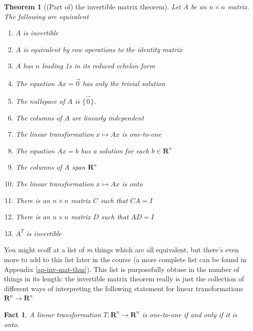 \documentclass[12pt]{article}
\numberwithin{equation}{subsection}
\numberwithin{figure}{subsection}
\newtheorem{thm}[subsection]{Theorem}
\newtheorem{fact}[subsection]{Fact}
\theoremstyle{note}
\begin{document}
\begin{thm}[(Part of) the invertible matrix theorem]\label{thm-inv-matrix-1}
	Let $A$ be an $n\times n$ matrix. The following are equivalent
	\begin{enumerate}
		\item $A$ is invertible
		\item $A$ is equivalent by row operations to the identity matrix
		\item $A$ has $n$ leading 1s in its reduced echelon form
		\item The equation $Ax=\vec{0}$ has only the trivial solution
		\item The nullspace of $A$ is $\{\vec{0}\}$. 
		\item The columns of $A$ are linearly independent
		\item The linear transformation $x\mapsto Ax$ is one-to-one
		\item The equation $Ax=b$ has a solution for each $b\in\mathbf{R}^n$
		\item The columns of $A$ span $\mathbf{R}^n$
		\item The linear transformation $x\mapsto Ax$ is onto
		\item There is an $n\times n$ matrix $C$ such that $CA=I$
		\item There is an $n\times n$ matrix $D$ such that $AD=I$
		\item $A^T$ is invertible
	\end{enumerate}
\end{thm}



You might scoff at a list of \textit{m} things which are all equivalent, but there's even more to add to this list later in the course (a more complete list can be found in Appendix \ref{ap-inv-mat-thm}). This list is purposefully obtuse in the number of things in its length: the invertible matrix theorem really is just the collection of different ways of interpreting the following statement for linear transformations $\mathbf{R}^n\to\mathbf{R}^n$

\begin{fact}
	A linear transformation $T\colon \mathbf{R}^n\to\mathbf{R}^n$ is one-to-one if and only if it is onto. 
\end{fact}



\end{document}
